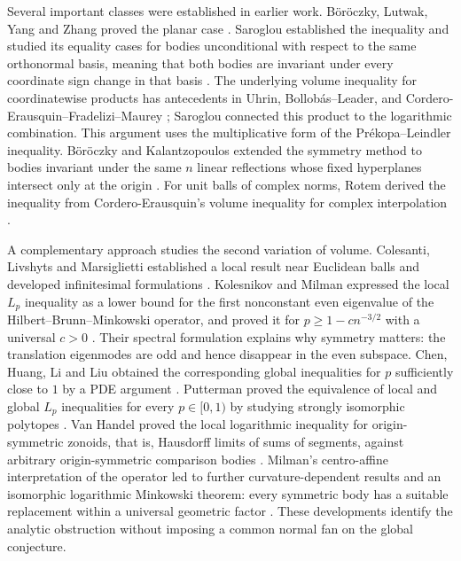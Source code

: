 Several important classes were established in earlier work.
B\"or\"oczky, Lutwak, Yang and Zhang proved the planar case
\cite[Theorem~1.3]{BLZY2012}.
Saroglou established the inequality and studied its equality cases for
bodies unconditional with respect to the same orthonormal basis, meaning that both bodies are invariant under
every coordinate sign change in that basis
\cite[Theorem~1.2]{Saroglou2015}.
The underlying volume inequality for coordinatewise products has antecedents
in Uhrin, Bollob\'as--Leader, and Cordero-Erausquin--Fradelizi--Maurey
\cite{Uhrin1994,BollobasLeader1995,CFM2004}; Saroglou connected this
product to the logarithmic combination. This argument uses the multiplicative
form of the Pr\'ekopa--Leindler inequality.
B\"or\"oczky and Kalantzopoulos extended the symmetry method to bodies
invariant under the same $n$ linear reflections whose fixed hyperplanes
intersect only at the origin \cite[Theorem~2]{BK2022}.
For unit balls of complex norms, Rotem derived the inequality from
Cordero-Erausquin's volume inequality for complex interpolation
\cite{Rotem2014,Cordero2002}.

A complementary approach studies the second variation of volume.
Colesanti, Livshyts and Marsiglietti established a local result near
Euclidean balls and developed infinitesimal formulations
\cite{CLM2017}. Kolesnikov and Milman expressed the local $L_p$ inequality
as a lower bound for the first nonconstant even eigenvalue of the
Hilbert--Brunn--Minkowski operator, and proved it for
$p\ge 1-c n^{-3/2}$ with a universal $c>0$ \cite{KM2022}.
Their spectral formulation explains why symmetry matters: the translation
eigenmodes are odd and hence disappear in the even subspace. Chen, Huang, Li and Liu obtained the corresponding global
inequalities for $p$ sufficiently close to $1$ by a PDE argument
\cite{CHLL2020}. Putterman proved the equivalence of local and global
$L_p$ inequalities for every $p\in[0,1)$ by studying strongly isomorphic
polytopes \cite[Theorem~1.7]{Putterman2021}.
Van Handel proved the local logarithmic inequality for origin-symmetric
zonoids, that is, Hausdorff limits of sums of segments, against arbitrary
origin-symmetric comparison bodies
\cite[Theorem~1.4 of the cited arXiv version]{vanHandel2023}.
Milman's centro-affine interpretation of the operator led to further
curvature-dependent results and an isomorphic logarithmic Minkowski
theorem: every symmetric body has a suitable replacement within a universal
geometric factor \cite{Milman2025}. These developments identify the
analytic obstruction without imposing a common normal fan on the global
conjecture.

